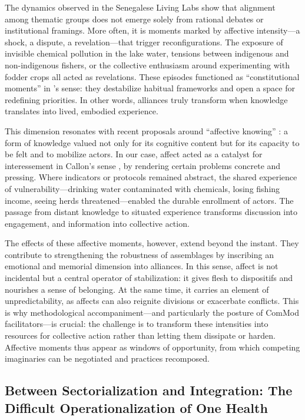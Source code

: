 \documentclass{article}
\begin{document}
The dynamics observed in the Senegalese Living Labs show that alignment among thematic groups does not emerge solely from rational debates or institutional framings. More often, it is moments marked by affective intensity—a shock, a dispute, a revelation—that trigger reconfigurations. The exposure of invisible chemical pollution in the lake water, tensions between indigenous and non-indigenous fishers, or the collective enthusiasm around experimenting with fodder crops all acted as revelations. These episodes functioned as “constitutional moments” in \textcite{jasanoff_constitutional_2011}’s sense: they destabilize habitual frameworks and open a space for redefining priorities. In other words, alliances truly transform when knowledge translates into lived, embodied experience.  

This dimension resonates with recent proposals around “affective knowing” \parencite{hertz_knowledge_2025}: a form of knowledge valued not only for its cognitive content but for its capacity to be felt and to mobilize actors. In our case, affect acted as a catalyst for interessement in Callon’s sense \parencite{callon_techno-economic_1990}, by rendering certain problems concrete and pressing. Where indicators or protocols remained abstract, the shared experience of vulnerability—drinking water contaminated with chemicals, losing fishing income, seeing herds threatened—enabled the durable enrollment of actors. The passage from distant knowledge to situated experience transforms discussion into engagement, and information into collective action.  

The effects of these affective moments, however, extend beyond the instant. They contribute to strengthening the robustness of assemblages by inscribing an emotional and memorial dimension into alliances. In this sense, affect is not incidental but a central operator of stabilization: it gives flesh to dispositifs and nourishes a sense of belonging. At the same time, it carries an element of unpredictability, as affects can also reignite divisions or exacerbate conflicts. This is why methodological accompaniment—and particularly the posture of ComMod facilitators—is crucial: the challenge is to transform these intensities into resources for collective action rather than letting them dissipate or harden. Affective moments thus appear as windows of opportunity, from which competing imaginaries can be negotiated and practices recomposed.  

\subsection{Between Sectorialization and Integration: The Difficult Operationalization of One Health}
\end{document}
